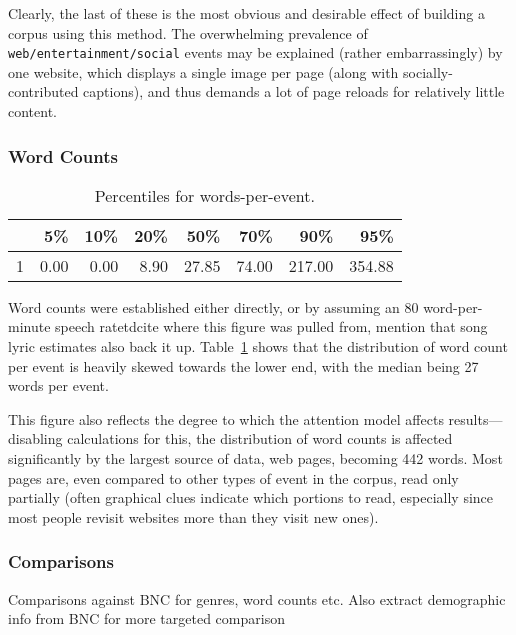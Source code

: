 Clearly, the last of these is the most obvious and desirable effect of building a corpus using this method.  The overwhelming prevalence of \texttt{web/entertainment/social} events may be explained (rather embarrassingly) by one website, which displays a single image per page (along with socially-contributed captions), and thus demands a lot of page reloads for relatively little content.





\subsubsection{Word Counts}

\begin{table}[ht]
\centering
\begin{tabular}{rrrrrrrr}
  \hline
 & 5\% & 10\% & 20\% & 50\% & 70\% & 90\% & 95\% \\ 
  \hline
1 & 0.00 & 0.00 & 8.90 & 27.85 & 74.00 & 217.00 & 354.88 \\ 
   \hline
\end{tabular}
\caption{Percentiles for words-per-event.}
\label{table:personal:wordsperevent}
\end{table}

Word counts were established either directly, or by assuming an 80 word-per-minute speech ratetd{cite where this figure was pulled from, mention that song lyric estimates also back it up}.  Table~\ref{table:personal:wordsperevent} shows that the distribution of word count per event is heavily skewed towards the lower end, with the median being 27 words per event.

This figure also reflects the degree to which the attention model affects results---disabling calculations for this, the distribution of word counts is affected significantly by the largest source of data, web pages, becoming 442 words.  Most pages are, even compared to other types of event in the corpus, read only partially (often graphical clues indicate which portions to read, especially since most people revisit websites more than they visit new ones).









\subsubsection{Comparisons}
Comparisons against BNC for genres, word counts etc.  Also extract demographic info from BNC for more targeted comparison

